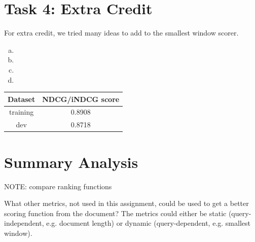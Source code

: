 \documentclass[10pt,twocolumn]{article}
\begin{document}
\section*{Task 4: Extra Credit}
For extra credit, we tried many ideas to add to the smallest window scorer.
\begin{enumerate}[(a)]
\item
\item
\item
\item

\end{enumerate}
\begin{table}[H]
\centering
\begin{tabular}{|c|c|}
\hline
Dataset & NDCG/iNDCG score \\\hline
training & 0.8908\\\hline
dev & 0.8718\\\hline
\end{tabular}
\end{table}

\section*{Summary Analysis}
NOTE: compare ranking functions

What other metrics, not used in this assignment, could be used to
get a better scoring function from the document? The metrics could
either be static (query-independent, e.g. document length) or dynamic
(query-dependent, e.g. smallest window).
\end{document}
